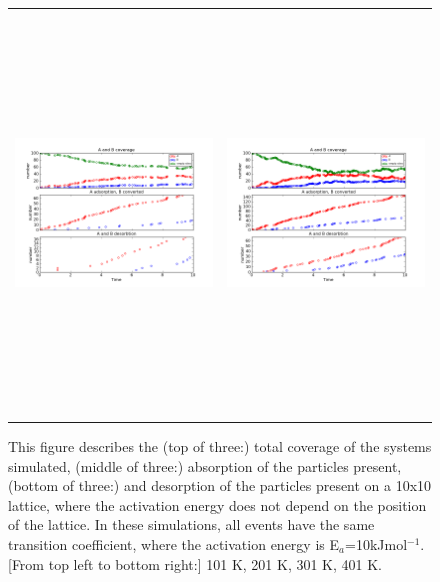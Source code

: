 \documentclass[11pt]{article}
\begin{document}
\begin{figure}[h!]
\begin{tabular}{cc}
\includegraphics[width=3.5in, height=4.2in]{./coadsorb_irreversible/AtoBirreversible10x10_301_allsameklarge_A5_EA10E3_3.png} &
\includegraphics[width=3.5in, height=4.2in]{./coadsorb_irreversible/AtoBirreversible10x10_401_allsameklarge_A5_EA10E3_3.png} 
\end{tabular}
\caption{This figure describes the (top of three:) total coverage of the systems simulated, (middle of three:) absorption of the particles present, (bottom of three:) and desorption of the particles present on a 10x10 lattice, where the activation energy does not depend on the position of the lattice. In these simulations, all events have the same transition coefficient, where the activation energy is E$_a$=10kJmol$^{-1}$. [From top left to bottom right:] 101 K, 201 K, 301 K, 401 K.}
\end{figure}
\end{document}
